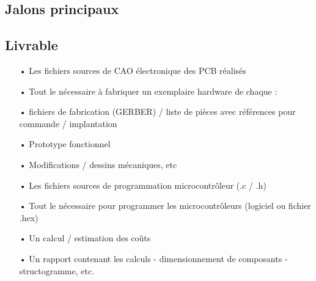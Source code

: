 \clearpage

\subsection{Jalons principaux}


\subsection{Livrable}
\begin{itemize}
	\item[•] Les fichiers sources de CAO électronique des PCB réalisés
	\item[•] Tout le nécessaire à fabriquer un exemplaire hardware de chaque :
	\item[•] fichiers de fabrication (GERBER) / liste de pièces avec références pour commande / implantation
	\item[•] Prototype fonctionnel
	\item[•] Modifications / dessins mécaniques, etc
	\item[•] Les fichiers sources de programmation microcontrôleur (.c  / .h)
	\item[•] Tout le nécessaire pour programmer les microcontrôleurs (logiciel ou fichier .hex)
	\item[•] Un calcul / estimation des coûts
	\item[•] Un rapport contenant les calculs - dimensionnement de composants - structogramme, etc.
\end{itemize}

\clearpage
